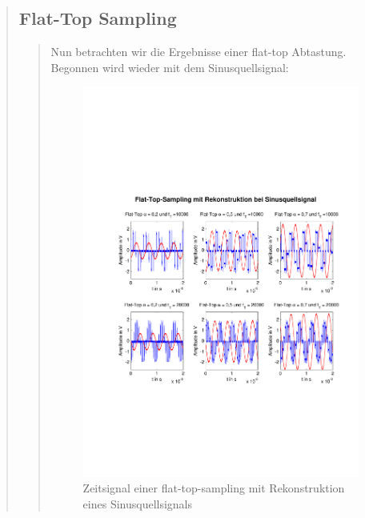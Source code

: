 \begin{quote}
        \subsection{Flat-Top Sampling}
        \begin{quote}
           
           Nun betrachten wir die Ergebnisse einer flat-top Abtastung. Begonnen
           wird wieder mit dem Sinusquellsignal:
           
           \begin{figure}[H]
            \centering
            \includegraphics[scale=0.6, trim = 1.5cm 6cm 1cm 8cm,
            clip]{./Bilder/flat-top-sinus}
                \caption{Zeitsignal einer flat-top-sampling mit Rekonstruktion
                eines Sinusquellsignals}
      	    \end{figure}
           

\end{quote}
\end{quote}
